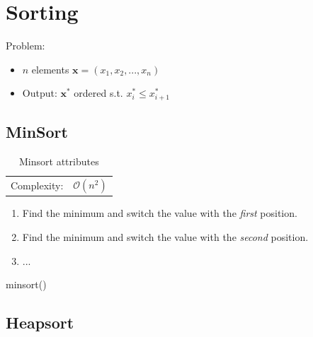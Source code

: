 \documentclass[12pt, a4paper]{scrartcl}
\author{Michael Floßmann}
\begin{document}
\tableofcontents{}
\section{Sorting}
\label{sec:sorting}
Problem:
\begin{itemize}
\item $n$ elements $\mathbf{x}=(x_1,x_2,...,x_n)$
\item Output: $\mathbf{x^*}$ ordered s.t. $x^*_i\le x^*_{i+1}$
\end{itemize}

\subsection{MinSort}
\label{sec:minsort}
\begin{table}[!h]
  \centering
  \begin{tabular}{lc}
    Complexity:&$\mathcal{O}(n^2)$
  \end{tabular}
  \caption{Minsort attributes}
  \label{tab:minsort}
\end{table}
\begin{enumerate}
\item Find the minimum and switch the value with the \emph{first} position.
\item Find the minimum and switch the value with the \emph{second} position.
\item ...
\end{enumerate}
\begin{listing}
  
  \caption{minsort()}
\end{listing}
\subsection{Heapsort}
\label{sec:minsort}
\end{document}
